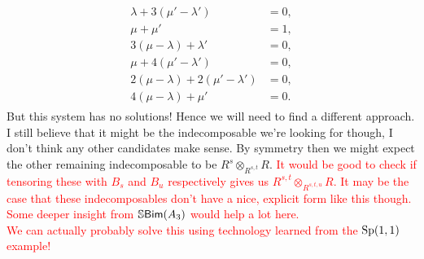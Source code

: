 \begin{example}
\begin{align*}
\begin{split}
\lambda + 3(\mu' - \lambda') &= 0,\\
\mu + \mu' &= 1,\\
3(\mu - \lambda) + \lambda' &= 0,\\
\mu + 4(\mu' - \lambda') &= 0,\\
2(\mu - \lambda) + 2(\mu' - \lambda') &= 0,\\
4(\mu - \lambda) + \mu' &= 0.
\end{split}
\end{align*}
\noindent But this system has no solutions! Hence we will need to find a different approach. I still believe that it might be the indecomposable we're looking for though, I don't think any other candidates make sense. By symmetry then we might expect the other remaining indecomposable to be $R^s \otimes_{R^{s,t}} R$. %
\textcolor{red}{It would be good to check if tensoring these with $B_s$ and $B_u$ respectively gives us $R^{s,t} \otimes_{R^{s,t,u}} R$. It may be the case that these indecomposables don't have a nice, explicit form like this though. Some deeper insight from $\mathbb{S}\textnormal{\textsf{Bim}}(A_3)$ would help a lot here.}\\

\noindent\textcolor{red}{We can actually probably solve this using technology learned from the $\textup{Sp}(1, 1)$ example!}
\newpage


\end{example}
